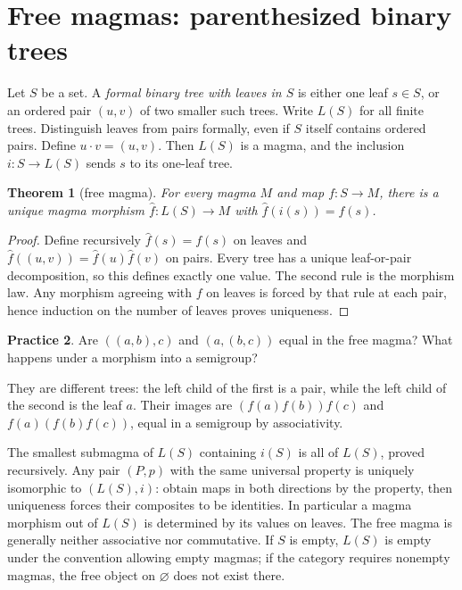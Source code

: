 \documentclass[11pt,openany]{book}
\newtheorem{theorem}{Theorem}[chapter]
\theoremstyle{definition}
\newtheorem{exercise}[theorem]{Practice}
\begin{document}
\section{Free magmas: parenthesized binary trees}
Let $S$ be a set. A \emph{formal binary tree with leaves in $S$} is either one leaf $s\in S$, or an ordered pair $(u,v)$ of two smaller such trees. Write $L(S)$ for all finite trees. Distinguish leaves from pairs formally, even if $S$ itself contains ordered pairs. Define $u\cdot v=(u,v)$. Then $L(S)$ is a magma, and the inclusion $i:S\to L(S)$ sends $s$ to its one-leaf tree.
\begin{theorem}[free magma]For every magma $M$ and map $f:S\to M$, there is a unique magma morphism $\widehat f:L(S)\to M$ with $\widehat f(i(s))=f(s)$.\end{theorem}
\begin{proof}Define recursively $\widehat f(s)=f(s)$ on leaves and $\widehat f((u,v))=\widehat f(u)\widehat f(v)$ on pairs. Every tree has a unique leaf-or-pair decomposition, so this defines exactly one value. The second rule is the morphism law. Any morphism agreeing with $f$ on leaves is forced by that rule at each pair, hence induction on the number of leaves proves uniqueness.\end{proof}
\begin{exercise}Are $((a,b),c)$ and $(a,(b,c))$ equal in the free magma? What happens under a morphism into a semigroup?\end{exercise}
\begin{solution}They are different trees: the left child of the first is a pair, while the left child of the second is the leaf $a$. Their images are $(f(a)f(b))f(c)$ and $f(a)(f(b)f(c))$, equal in a semigroup by associativity.\end{solution}
The smallest submagma of $L(S)$ containing $i(S)$ is all of $L(S)$, proved recursively. Any pair $(P,p)$ with the same universal property is uniquely isomorphic to $(L(S),i)$: obtain maps in both directions by the property, then uniqueness forces their composites to be identities. In particular a magma morphism out of $L(S)$ is determined by its values on leaves.
The free magma is generally neither associative nor commutative. If $S$ is empty, $L(S)$ is empty under the convention allowing empty magmas; if the category requires nonempty magmas, the free object on $\varnothing$ does not exist there.
\end{document}
